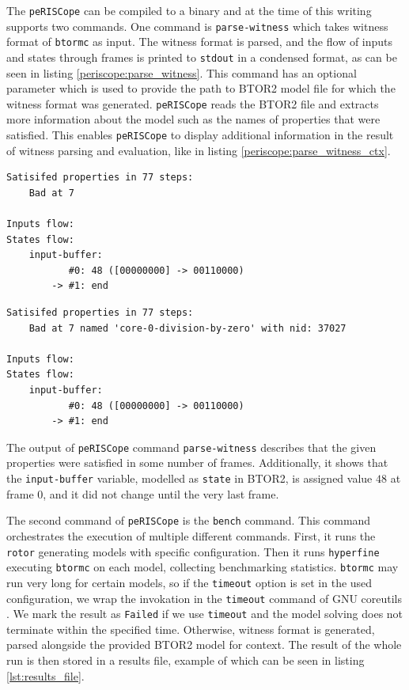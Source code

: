 \documentclass[12pt]{article}
\begin{document}
The \texttt{peRISCope} can be compiled to a binary and at the time of this
writing supports two commands. One command is \texttt{parse-witness} which
takes witness format of \texttt{btormc} as input. The witness format is parsed,
and the flow of inputs and states through frames is printed to \texttt{stdout}
in a condensed format, as can be seen in listing \ref{periscope:parse_witness}.
This command has an optional parameter which is used to provide the path to
BTOR2 model file for which the witness format was generated. \texttt{peRISCope}
reads the BTOR2 file and extracts more information about the model such as the
names of properties that were satisfied. This enables \texttt{peRISCope} to
display additional information in the result of witness parsing and evaluation,
like in listing \ref{periscope:parse_witness_ctx}.

\begin{lstlisting}[label=periscope:parse_witness, caption={Example output of
                \texttt{peRISCope} \texttt{parse-witness} command.},
                captionpos=b]
Satisifed properties in 77 steps:
    Bad at 7

Inputs flow:
States flow:
    input-buffer:
           #0: 48 ([00000000] -> 00110000)
        -> #1: end
\end{lstlisting}

\begin{lstlisting}[label=periscope:parse_witness_ctx, caption={Example output
                of \texttt{peRISCope} \texttt{ parse-witness} command with
                provided BTOR2 file for context.}, captionpos=b]
Satisifed properties in 77 steps:
    Bad at 7 named 'core-0-division-by-zero' with nid: 37027

Inputs flow:
States flow:
    input-buffer:
           #0: 48 ([00000000] -> 00110000)
        -> #1: end
\end{lstlisting}

The output of \texttt{peRISCope} command \texttt{parse-witness} describes that
the given properties were satisfied in some number of frames. Additionally, it
shows that the \texttt{input-buffer} variable, modelled as \texttt{state} in
BTOR2, is assigned value $48$ at frame $0$, and it did not change until the
very last frame.

The second command of \texttt{peRISCope} is the \texttt{bench} command. This
command orchestrates the execution of multiple different commands. First, it 
runs the \texttt{rotor} generating models with specific configuration. Then it
runs \texttt{hyperfine} executing \texttt{btormc} on each model, collecting
benchmarking statistics. \texttt{btormc} may run very long for certain models,
so if the \texttt{timeout} option is set in the used configuration, we wrap the
invokation in the \texttt{timeout} command of GNU coreutils
\cite{gnu:coreutils}. We mark the result as \texttt{Failed} if we use
\texttt{timeout} and the model solving does not terminate within the specified
time. Otherwise, witness format is generated, parsed alongside the provided
BTOR2 model for context. The result of the whole run is then stored in a
results file, example of which can be seen in listing \ref{lst:results_file}.
\end{document}
